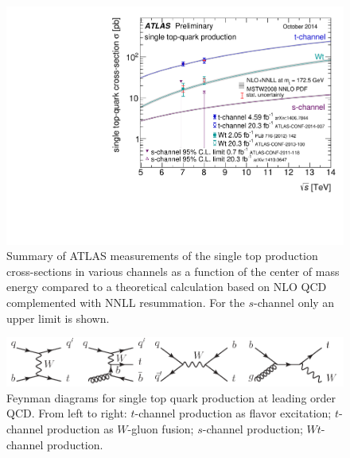 \begin{figure}
\includegraphics[width=\textwidth]{fig/thry/singletop_allchanvsroots_ATLASonly.pdf}
\caption{Summary of ATLAS measurements of the single top production cross-sections in various channels as a function of the center of mass energy compared to a theoretical calculation based on NLO QCD complemented with NNLL resummation. For the $s$-channel only an upper limit is shown.}
\label{fig:txsec}
\end{figure}

\begin{figure}
\includegraphics[width=\textwidth]{fig/thry/fig_singletop.png}
\caption{Feynman diagrams for single top quark production at leading order QCD. From left to right: $t$-channel production as flavor excitation; $t$-channel production as $W$-gluon fusion; $s$-channel production; $Wt$-channel production.}
\label{fig:tdiag}
\end{figure}

